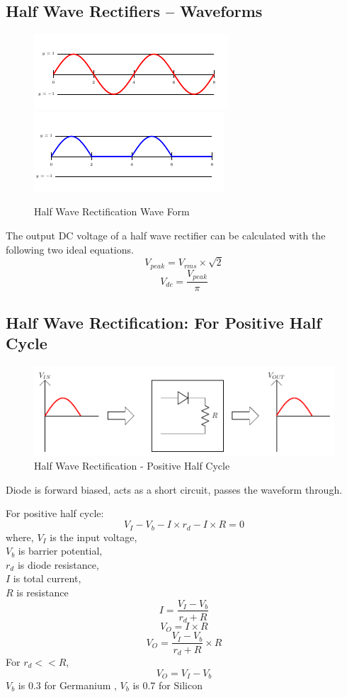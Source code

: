 		\subsection{Half Wave Rectifiers – Waveforms}
			\begin{figure}[h]
				\centering
				\includegraphics[width=0.7\linewidth]{img/exp6/6}
				\includegraphics[width=0.7\linewidth]{img/exp6/4}
				\caption{Half Wave Rectification Wave Form}
				\label{fig:rfhwwf}
			\end{figure}
			The output DC voltage of a half wave rectifier can be calculated with the following two ideal equations.			
			$$V_{peak}=V_{rms} \times \sqrt{2}$$
			$$V_{dc}=\frac{V_{peak}}{\pi}$$
		
		\subsection{Half Wave Rectification: For Positive Half Cycle}
			\begin{figure}[h]
				\centering
				\includegraphics[width=0.9\linewidth]{img/exp6/5}
				\caption{Half Wave Rectification - Positive Half Cycle}
				\label{fig:rfhwphc}
			\end{figure}			
			Diode is forward biased, acts as a short circuit, passes the waveform through.
			
			For positive half cycle: $$V_I - V_b - I \times r_d - I \times R=0$$ where,
			$V_I$ is the input voltage,\\
			$V_b$ is barrier potential,\\
			$r_d$ is diode resistance,\\
			$I$ is total current,\\
			$R$ is resistance\\
			$$I=\frac{V_I - V_b}{r_d + R}$$
			$$V_O = I \times R$$
			$$V_O =\frac{V_I - V_b}{r_d + R} \times R$$
			For $r_d << R$,
			$$V_O = V_I- V_b$$
			$V_b$ is 0.3 for Germanium ,
			$V_b$ is 0.7 for Silicon
			
